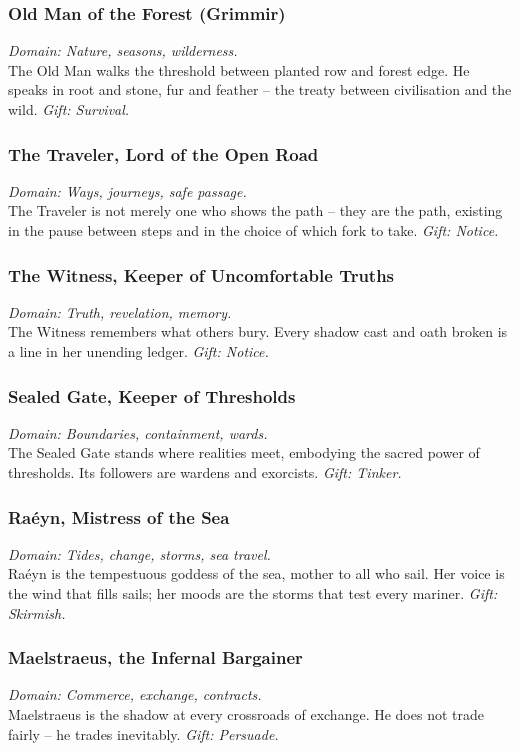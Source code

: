 \subsubsection{Old Man of the Forest (Grimmir)}
\emph{Domain: Nature, seasons, wilderness.} \\
The Old Man walks the threshold between planted row and forest edge. He speaks in root and stone, fur and feather -- the treaty between civilisation and the wild. \textit{Gift: Survival.}

\subsubsection{The Traveler, Lord of the Open Road}
\emph{Domain: Ways, journeys, safe passage.} \\
The Traveler is not merely one who shows the path -- they are the path, existing in the pause between steps and in the choice of which fork to take. \textit{Gift: Notice.}

\subsubsection{The Witness, Keeper of Uncomfortable Truths}
\emph{Domain: Truth, revelation, memory.} \\
The Witness remembers what others bury. Every shadow cast and oath broken is a line in her unending ledger. \textit{Gift: Notice.}

\subsubsection{Sealed Gate, Keeper of Thresholds}
\emph{Domain: Boundaries, containment, wards.} \\
The Sealed Gate stands where realities meet, embodying the sacred power of thresholds. Its followers are wardens and exorcists. \textit{Gift: Tinker.}

\subsubsection{Raéyn, Mistress of the Sea}
\emph{Domain: Tides, change, storms, sea travel.} \\
Raéyn is the tempestuous goddess of the sea, mother to all who sail. Her voice is the wind that fills sails; her moods are the storms that test every mariner. \textit{Gift: Skirmish.}

\subsubsection{Maelstraeus, the Infernal Bargainer}
\emph{Domain: Commerce, exchange, contracts.} \\
Maelstraeus is the shadow at every crossroads of exchange. He does not trade fairly -- he trades inevitably. \textit{Gift: Persuade.}

